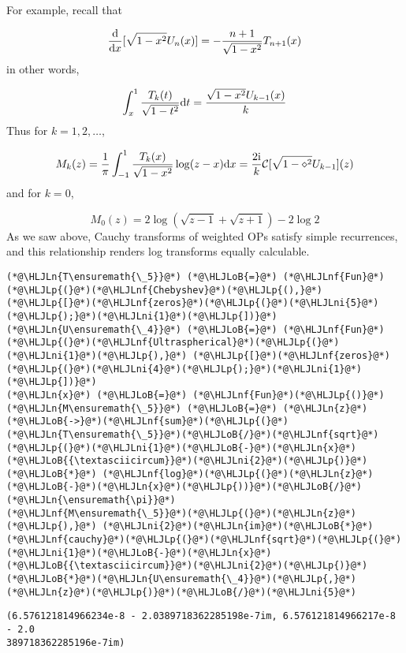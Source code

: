 \documentclass[12pt,a4paper]{article}
\newcommand{\HLJLn}[1]{#1}
\newcommand{\HLJLnf}[1]{\textcolor[RGB]{66,102,213}{#1}}
\newcommand{\HLJLni}[1]{\textcolor[RGB]{59,151,46}{#1}}
\newcommand{\HLJLoB}[1]{\textcolor[RGB]{102,102,102}{\textbf{#1}}}
\newcommand{\HLJLp}[1]{#1}
\def\D{ {\rm d} }
\def\I{ {\rm i} }
\def\CC{ {\cal C} }
\def\dx{\D x}
\def\dt{\D t}
\begin{document}
For example, recall that

\[
{\D\over \dx}[\sqrt{1-x^2} U_n(x)] = -{n+1 \over \sqrt{1-x^2}} T_{n+1}(x)
\]
in other words,

\[
\int_x^1 {T_k(t) \over \sqrt{1-t^2}} \dt = {\sqrt{1-x^2} U_{k-1}(x) \over k}
\]
Thus for $k=1,2,\ldots$,

\[
M_k(z)= {1 \over \pi} \int_{-1}^1 {T_k(x) \over \sqrt{1-x^2}}\log(z-x) \dx  = {2\I \over k} \CC[\sqrt{1-\diamond^2} U_{k-1}](z)
\]
and for $k = 0$,

\[
M_0(z) = 2\log(\sqrt{z-1} + \sqrt{z+1}) - 2\log 2
\]
As we saw above, Cauchy transforms of weighted OPs satisfy simple recurrences, and this relationship renders log transforms equally calculable.


\begin{lstlisting}
(*@\HLJLn{T\ensuremath{\_5}}@*) (*@\HLJLoB{=}@*) (*@\HLJLnf{Fun}@*)(*@\HLJLp{(}@*)(*@\HLJLnf{Chebyshev}@*)(*@\HLJLp{(),}@*) (*@\HLJLp{[}@*)(*@\HLJLnf{zeros}@*)(*@\HLJLp{(}@*)(*@\HLJLni{5}@*)(*@\HLJLp{);}@*)(*@\HLJLni{1}@*)(*@\HLJLp{])}@*)
(*@\HLJLn{U\ensuremath{\_4}}@*) (*@\HLJLoB{=}@*) (*@\HLJLnf{Fun}@*)(*@\HLJLp{(}@*)(*@\HLJLnf{Ultraspherical}@*)(*@\HLJLp{(}@*)(*@\HLJLni{1}@*)(*@\HLJLp{),}@*) (*@\HLJLp{[}@*)(*@\HLJLnf{zeros}@*)(*@\HLJLp{(}@*)(*@\HLJLni{4}@*)(*@\HLJLp{);}@*)(*@\HLJLni{1}@*)(*@\HLJLp{])}@*)
(*@\HLJLn{x}@*) (*@\HLJLoB{=}@*) (*@\HLJLnf{Fun}@*)(*@\HLJLp{()}@*)
(*@\HLJLn{M\ensuremath{\_5}}@*) (*@\HLJLoB{=}@*) (*@\HLJLn{z}@*)(*@\HLJLoB{->}@*)(*@\HLJLnf{sum}@*)(*@\HLJLp{(}@*)(*@\HLJLn{T\ensuremath{\_5}}@*)(*@\HLJLoB{/}@*)(*@\HLJLnf{sqrt}@*)(*@\HLJLp{(}@*)(*@\HLJLni{1}@*)(*@\HLJLoB{-}@*)(*@\HLJLn{x}@*)(*@\HLJLoB{{\textasciicircum}}@*)(*@\HLJLni{2}@*)(*@\HLJLp{)}@*) (*@\HLJLoB{*}@*) (*@\HLJLnf{log}@*)(*@\HLJLp{(}@*)(*@\HLJLn{z}@*)(*@\HLJLoB{-}@*)(*@\HLJLn{x}@*)(*@\HLJLp{))}@*)(*@\HLJLoB{/}@*)(*@\HLJLn{\ensuremath{\pi}}@*)
(*@\HLJLnf{M\ensuremath{\_5}}@*)(*@\HLJLp{(}@*)(*@\HLJLn{z}@*)(*@\HLJLp{),}@*) (*@\HLJLni{2}@*)(*@\HLJLn{im}@*)(*@\HLJLoB{*}@*)(*@\HLJLnf{cauchy}@*)(*@\HLJLp{(}@*)(*@\HLJLnf{sqrt}@*)(*@\HLJLp{(}@*)(*@\HLJLni{1}@*)(*@\HLJLoB{-}@*)(*@\HLJLn{x}@*)(*@\HLJLoB{{\textasciicircum}}@*)(*@\HLJLni{2}@*)(*@\HLJLp{)}@*)(*@\HLJLoB{*}@*)(*@\HLJLn{U\ensuremath{\_4}}@*)(*@\HLJLp{,}@*)(*@\HLJLn{z}@*)(*@\HLJLp{)}@*)(*@\HLJLoB{/}@*)(*@\HLJLni{5}@*)
\end{lstlisting}

\begin{lstlisting}
(6.576121814966234e-8 - 2.0389718362285198e-7im, 6.576121814966217e-8 - 2.0
389718362285196e-7im)
\end{lstlisting}
\end{document}
